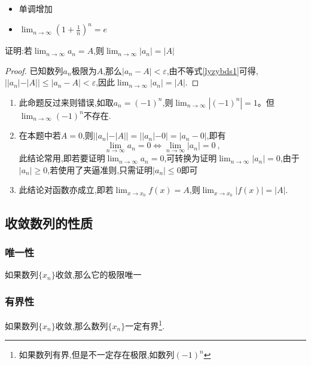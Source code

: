 \documentclass[12pt, a4paper, oneside, UTF8]{ctexbook}
\begin{document}
\begin{sloppypar}
\begin{criterion}{}{}
\begin{itemize}
            \begin{itemize}
                \item 单调增加
                \item $\lim_{n\to \infty}(1+\frac{1}{n})^n=e$
            \end{itemize}
        \end{itemize}
    \end{criterion}
    \begin{problem}
        证明:若$\lim_{n \to \infty}a_n=A$,则$\lim_{n \to \infty}|a_n|=|A|$
    \end{problem}
    \begin{proof}
        已知数列$a_n$极限为$A$,那么$|a_n-A|<\varepsilon$,由不等式\ref{lyzybds1}可得,$||a_n|-|A||\leqslant|a_n -A|<\varepsilon$,因此$\lim_{n \to \infty }|a_n|=|A|$.
        \end{proof}
    \begin{note}
        \begin{enumerate}
            \item 此命题反过来则错误,如取$a_n=(-1)^n$,则$\lim_{n\to\infty}\left|(-1)^n\right|=1$。但$\lim_{n\to\infty}(-1)^n$不存在.
            \item 在本题中若$A=0$,则$||a_n|-|A||=||a_n|-0|=|a_n-0|$,即有
            $$
            \lim_{n\to\infty}a_{n}=0\Leftrightarrow\lim_{n\to\infty}\lvert a_{n}\rvert=0\:,
            $$
            此结论常用,即若要证明$\lim _{n \to \infty}a_n=0$,可转换为证明$\lim_{n \to \infty}|a_n|=0$,由于$|a_n| \geq 0$,若使用了夹逼准则,只需证明$|a_n|\leqslant 0$即可
            \item 此结论对函数亦成立,即若$\lim_{x\to x_0 }f\left(x\right)=A$,则$\lim_{x\to x_0}\left|f\left(x\right)\right|=\left|A\right|.$
        \end{enumerate}
    \end{note}
    \subsection{收敛数列的性质}
    \subsubsection{唯一性}
    \begin{them}{}{}
        如果数列$\{ x_n \}$收敛,那么它的极限唯一
    \end{them}
    \subsubsection{有界性}
    \begin{them}{}{}
        如果数列$\{x_n\}$收敛,那么数列$\{x_n\}$一定有界\footnote{如果数列有界,但是不一定存在极限,如数列$(-1)^n$}.
    \end{them}

\end{sloppypar}
\end{document}
